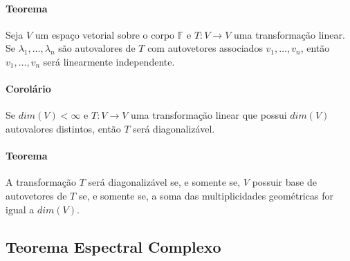 \documentclass{article}
\begin{document}
        \paragraph{Teorema}Seja $V$ um espaço vetorial sobre o corpo $\mathbb{F}$ e $T: V \rightarrow V$ uma transformação linear. Se $\lambda_{1}, \dots, \lambda_{n}$ são autovalores de $T$ com autovetores associados $v_{1}, \dots, v_{n}$, então ${v_{1}, \dots, v_{n}}$ será linearmente independente.

        \paragraph{Corolário}Se $dim(V) < \infty$ e $T: V \rightarrow V$ uma transformação linear que possui $dim(V)$ autovalores distintos, então $T$ será diagonalizável.

        \paragraph{Teorema}A transformação $T$ será diagonalizável se, e somente se, $V$ possuir base de autovetores de $T$ se, e somente se, a soma das multiplicidades geométricas for igual a $dim(V)$.

        \subsection{Teorema Espectral Complexo}
\end{document}
